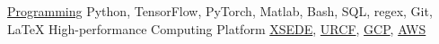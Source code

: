 

\begin{cvskills}

  \cvskill
    {\href{https://github.com/z2e2}{Programming}} %
    {Python, TensorFlow, PyTorch, Matlab, Bash, SQL, regex, Git, \LaTeX} %
 \cvskill
    {High-performance Computing Platform} %
    {\href{https://www.xsede.org/}{XSEDE}, \href{https://drexel.edu/core-facilities/facilities/research-computing/}{URCF}, \href{https://cloud.google.com/}{GCP},  \href{https://aws.amazon.com/}{AWS}} %

\end{cvskills}

